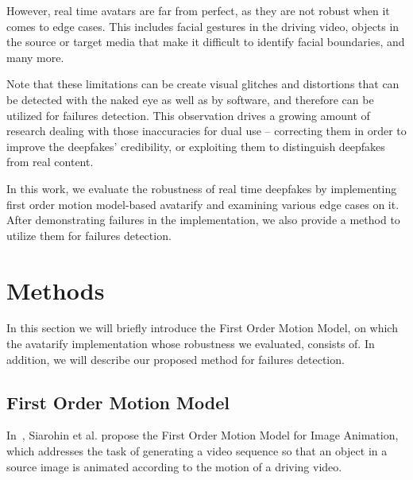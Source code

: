 \documentclass[english,12pt]{article}
\begin{document}
However, real time avatars are far from perfect, as they are not robust when it comes to edge cases.
This includes facial gestures in the driving video, objects in the source or target media that make it
difficult to identify facial boundaries, and many more.


Note that these limitations can be create visual glitches and distortions that can be detected with the
naked eye as well as by software, and therefore can be utilized for failures detection. This observation
drives a growing amount of research dealing with those inaccuracies for dual use -- correcting them in
order to improve the deepfakes' credibility, or exploiting them to distinguish deepfakes from real content.

In this work, we evaluate the robustness of real time deepfakes by implementing first order motion
model-based avatarify and examining various edge cases on it. After demonstrating failures in the
implementation, we also provide a method to utilize them for failures detection.



\section{Methods} \label{methods}

In this section we will briefly introduce the First Order Motion Model, on which the avatarify implementation
whose robustness we evaluated, consists of. In addition, we will describe our proposed method for failures detection.

\subsection{First Order Motion Model} \label{implementation}


In~\cite{DBLP:journals/corr/abs-2003-00196}, Siarohin et al. propose the First Order Motion Model for Image
Animation, which addresses the task of generating a video sequence so that an object in a source image
is animated according to the motion of a driving video.
\end{document}
